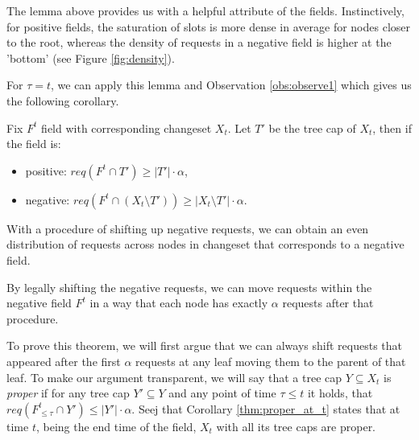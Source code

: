 The lemma above provides us with a helpful attribute of the fields. Instinctively, for
positive fields, the saturation of slots is more dense in average for nodes
closer to the root, whereas the density of requests in a negative field is higher
at the 'bottom' (see Figure \ref{fig:density}).

For $\tau = t$, we can apply this lemma and Observation \ref{obs:observe1} which
gives us the following corollary.  \begin{corollary} Fix $F^t$ field with
corresponding changeset $X_t$. Let $T'$ be the tree cap of $X_t$, then if the field
is: \begin{itemize} \item positive: $req(F^t \cap T') \geq |T'| \cdot \alpha$,
\item negative: $req(F^t \cap (X_t \setminus T')) \geq |X_t \setminus T'| \cdot
\alpha$.  \end{itemize} \label{thm:proper_at_t} \end{corollary}


With a procedure of shifting up negative requests, we can obtain an even
distribution of requests across nodes in changeset that corresponds to a
negative field.  \begin{theorem} By legally shifting the negative requests, we
can move requests within the negative field $F^t$ in a way that each node has
exactly $\alpha$ requests after that procedure.  \label{thm:legal_shifting_up}
\end{theorem} To prove this theorem, we will first argue that we can always
shift requests that appeared after the first $\alpha$ requests at any leaf moving
them to the parent of that leaf. To make our argument transparent, we will say 
that a tree cap $Y \subseteq X_t$ is \textit{proper} if for any tree cap $Y'
\subseteq Y$ and any point of time $\tau \leq t$ it holds, that $req(F^t_{\leq
\tau} \cap Y') \leq |Y'| \cdot \alpha$. Seej that Corollary
\ref{thm:proper_at_t} states that at time $t$, being the end time of the field,
$X_t$ with all its tree caps are proper.

